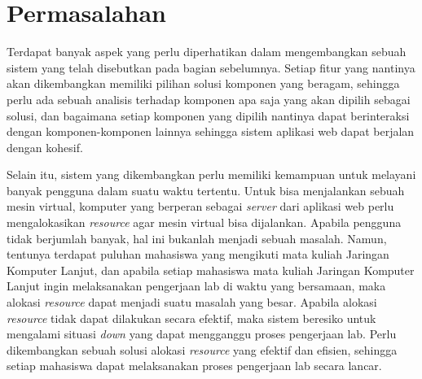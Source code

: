 
\section{Permasalahan}
\label{sec:masalah}
Terdapat banyak aspek yang perlu diperhatikan dalam mengembangkan sebuah sistem yang telah disebutkan pada bagian sebelumnya. Setiap fitur yang nantinya akan dikembangkan
memiliki pilihan solusi komponen yang beragam, sehingga perlu ada sebuah analisis terhadap komponen apa saja yang akan dipilih sebagai solusi, dan bagaimana 
setiap komponen yang dipilih nantinya dapat berinteraksi dengan komponen-komponen lainnya sehingga sistem aplikasi web dapat berjalan dengan kohesif. 
\par

Selain itu, sistem yang dikembangkan perlu memiliki kemampuan untuk melayani banyak pengguna dalam suatu waktu tertentu. Untuk bisa menjalankan sebuah mesin virtual,
komputer yang berperan sebagai \textit{server} dari aplikasi web perlu mengalokasikan \textit{resource} agar mesin virtual bisa dijalankan. Apabila pengguna tidak berjumlah banyak,
hal ini bukanlah menjadi sebuah masalah. Namun, tentunya terdapat puluhan mahasiswa yang mengikuti mata kuliah Jaringan Komputer Lanjut, dan apabila setiap mahasiswa
mata kuliah Jaringan Komputer Lanjut ingin melaksanakan pengerjaan lab di waktu yang bersamaan, maka alokasi \textit{resource} dapat menjadi suatu masalah yang besar.
Apabila alokasi \textit{resource} tidak dapat dilakukan secara efektif, maka sistem beresiko untuk mengalami situasi \textit{down} yang dapat mengganggu proses pengerjaan lab.
Perlu dikembangkan sebuah solusi alokasi \textit{resource} yang efektif dan efisien, sehingga setiap mahasiswa dapat melaksanakan proses pengerjaan lab secara lancar.
\par

